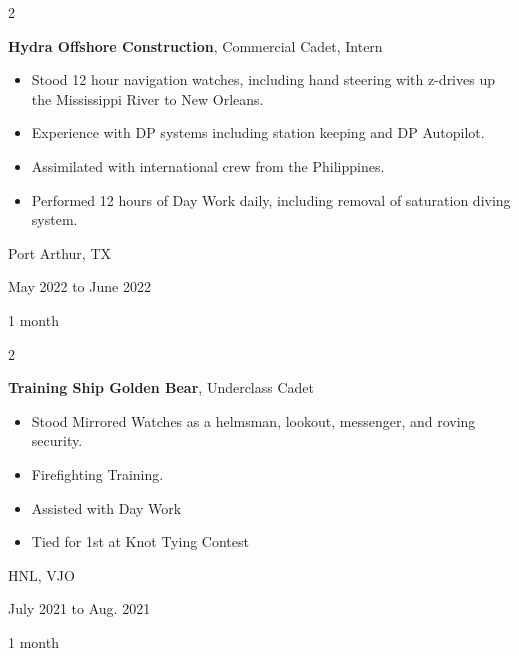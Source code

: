 \documentclass[10pt, letterpaper]{article}
\newenvironment{highlights}{
    \begin{itemize}[
        topsep=0.10 cm,
        parsep=0.10 cm,
        partopsep=0pt,
        itemsep=0pt,
        leftmargin=0.4 cm + 10pt
    ]
}{
    \end{itemize}
} %
\newenvironment{twocolentry}[2][]{
    \onecolentry
    \def\secondColumn{#2}
    \setcolumnwidth{\fill, 4.5 cm}
    \begin{paracol}{2}
}{
    \switchcolumn \raggedleft \secondColumn
    \end{paracol}
    \endonecolentry
} %
\begin{document}
        \vspace{0.2 cm}

        \begin{twocolentry}{
            Port Arthur, TX

        May 2022 to June 2022

        1 month
        }
            \textbf{Hydra Offshore Construction}, Commercial Cadet, Intern
            \begin{highlights}
                \item Stood 12 hour navigation watches, including hand steering with z-drives up the Mississippi River to New Orleans.
                \item Experience with DP systems including station keeping and DP Autopilot.
                \item Assimilated with international crew from the Philippines.
                \item Performed 12 hours of Day Work daily, including removal of saturation diving system.
            \end{highlights}
        \end{twocolentry}


        \vspace{0.2 cm}

        \begin{twocolentry}{
            HNL, VJO

        July 2021 to Aug. 2021

        1 month
        }
            \textbf{Training Ship Golden Bear}, Underclass Cadet
            \begin{highlights}
                \item Stood Mirrored Watches as a helmsman, lookout, messenger, and roving security.
                \item Firefighting Training.
                \item Assisted with Day Work
                \item Tied for 1st at Knot Tying Contest
            \end{highlights}
        \end{twocolentry}


        \vspace{0.2 cm}
\end{document}
